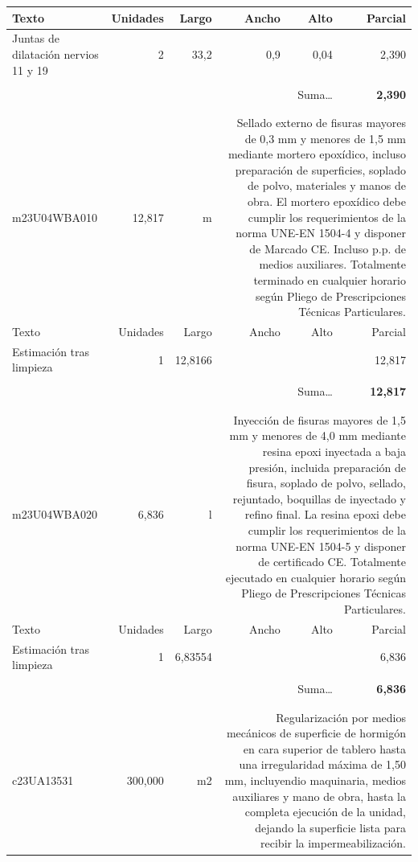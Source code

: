 \documentclass{book}%
\begin{document}
\begin{longtable}{lrrrrr}
Texto&Unidades&Largo&Ancho&Alto&Parcial\\%
\hline%
\multicolumn{1}{p{3.5cm}}{Juntas de dilatación nervios 11 y 19}&2&33,2&0,9&0,04&     2,390\\%
&&&&&\\%
\multicolumn{5}{r}{Suma\ldots}&\textbf{     2,390}\\%
\hline%
&&&&&\\%
&&&&&\\%
m23U04WBA010&    12,817& m&\multicolumn{3}{p{6cm}}{\scriptsize Sellado externo de fisuras mayores de 0,3 mm y menores de 1,5 mm mediante mortero epoxídico, incluso preparación de superficies, soplado de polvo, materiales y manos de obra. El mortero epoxídico debe cumplir los requerimientos de la norma UNE-EN 1504-4 y disponer de Marcado CE. Incluso p.p. de medios auxiliares. Totalmente terminado en cualquier horario según Pliego de Prescripciones Técnicas Particulares.\normalsize}\\%
Texto&Unidades&Largo&Ancho&Alto&Parcial\\%
\hline%
\multicolumn{1}{p{3.5cm}}{Estimación tras limpieza}&1&12,8166&&&    12,817\\%
&&&&&\\%
\multicolumn{5}{r}{Suma\ldots}&\textbf{    12,817}\\%
\hline%
&&&&&\\%
&&&&&\\%
m23U04WBA020&     6,836& l&\multicolumn{3}{p{6cm}}{\scriptsize Inyección de fisuras mayores de 1,5 mm y menores de 4,0 mm mediante resina epoxi inyectada a baja presión, incluida preparación de fisura, soplado de polvo, sellado, rejuntado, boquillas de inyectado y refino final. La resina epoxi debe cumplir los requerimientos de la norma UNE-EN 1504-5 y disponer de certificado CE. Totalmente ejecutado en cualquier horario según Pliego de Prescripciones Técnicas Particulares.\normalsize}\\%
Texto&Unidades&Largo&Ancho&Alto&Parcial\\%
\hline%
\multicolumn{1}{p{3.5cm}}{Estimación tras limpieza}&1&6,83554&&&     6,836\\%
&&&&&\\%
\multicolumn{5}{r}{Suma\ldots}&\textbf{     6,836}\\%
\hline%
&&&&&\\%
&&&&&\\%
c23UA13531&   300,000& m2&\multicolumn{3}{p{6cm}}{\scriptsize Regularización por medios mecánicos de superficie de hormigón en cara superior de tablero hasta una irregularidad máxima de 1,50 mm, incluyendio maquinaria, medios auxiliares y mano de obra, hasta la completa ejecución de la unidad, dejando la superficie lista para recibir la impermeabilización.\normalsize}\\%

\end{longtable}
\end{document}

